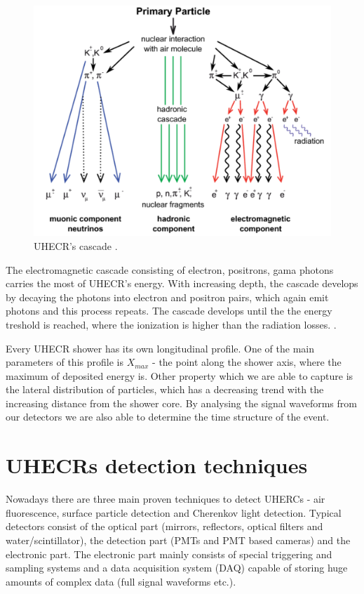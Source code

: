 \begin{figure}[H]
 \centering
 \includegraphics[scale = 0.3]{./pictures/cascade}
 \caption{UHECR's cascade \cite{Cascades}.}
 \label{cascade}
 
\end{figure}

\par

The electromagnetic cascade consisting of electron, positrons, gama photons carries the most of UHECR's energy. With increasing depth, the cascade develops by decaying the photons into electron and positron pairs, which again emit photons and this process repeats. The cascade develops until the the energy treshold is reached, where the ionization is higher than the radiation losses. \cite{Tomankova2016_1000061954}.


\par
Every UHECR shower has its own longitudinal profile. One of the main parameters of this profile is $X_{max}$ - the point along the shower axis, where the maximum of deposited energy is. Other property which we are able to capture is the lateral distribution of particles, which has a decreasing trend with the increasing distance from the shower core. By analysing the signal waveforms from our detectors we are also able to determine the time structure of the event.

\section{UHECRs detection techniques}
Nowadays there are three main proven techniques to detect UHERCs - 
air fluorescence, surface particle detection and Cherenkov light detection. Typical detectors consist of the optical part (mirrors, reflectors, optical filters and water/scintillator), the detection part (PMTs and PMT based cameras) and the electronic part. The electronic part mainly consists of special triggering and sampling systems and a data acquisition system (DAQ) capable of storing huge amounts of complex data (full signal waveforms etc.).


